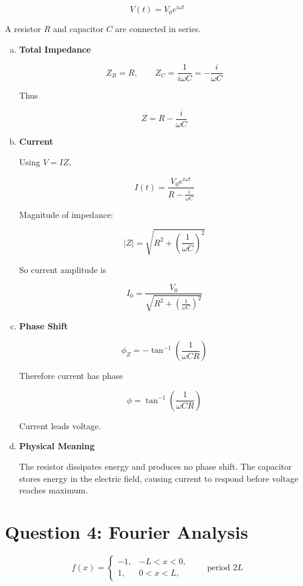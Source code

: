 \documentclass[12pt]{article}
\begin{document}
\[
V(t)=V_0e^{i\omega t}
\]

A resistor \(R\) and capacitor \(C\) are connected in series.

\begin{enumerate}[a)]

\item \textbf{Total Impedance}

\[
Z_R=R,
\qquad
Z_C=\frac{1}{i\omega C}=-\frac{i}{\omega C}
\]

Thus

\[
\boxed{
Z=R-\frac{i}{\omega C}}
\]

\item \textbf{Current}

Using \(V=IZ\),

\[
I(t)=\frac{V_0e^{i\omega t}}{R-\frac{i}{\omega C}}
\]

Magnitude of impedance:

\[
|Z|=\sqrt{R^2+\left(\frac{1}{\omega C}\right)^2}
\]

So current amplitude is

\[
\boxed{
I_0=\frac{V_0}{\sqrt{R^2+\left(\frac{1}{\omega C}\right)^2}}}
\]

\item \textbf{Phase Shift}

\[
\phi_Z=
-\tan^{-1}\!\left(\frac{1}{\omega CR}\right)
\]

Therefore current has phase

\[
\boxed{
\phi=
\tan^{-1}\!\left(\frac{1}{\omega CR}\right)}
\]

Current leads voltage.

\item \textbf{Physical Meaning}

The resistor dissipates energy and produces no phase shift.  
The capacitor stores energy in the electric field, causing current to respond before voltage reaches maximum.

\end{enumerate}

\newpage

\section*{Question 4: Fourier Analysis}

\[
f(x)=
\begin{cases}
-1,&-L<x<0,\\
1,&0<x<L,
\end{cases}
\qquad \text{period }2L
\]
\end{document}
